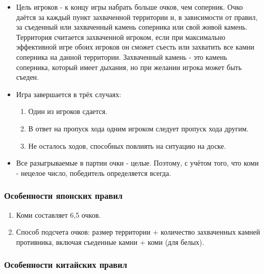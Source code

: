 \begin{itemize}
\item Цель игроков - к концу игры набрать больше очков, чем соперник. Очко даётся за каждый пункт захваченной территории и, в зависимости от правил, за съеденный или захваченный камень соперника или свой живой камень. Территория считается захваченной игроком, если при максимально эффективной игре обоих игроков он сможет съесть или захватить все камни соперника на данной территории. Захваченный камень - это камень соперника, который имеет дыхания, но при желании игрока может быть съеден.\\

\item Игра завершается в трёх случаях:


\begin{enumerate}

	\item Один из игроков сдается.\\
	\item В ответ на пропуск хода одним игроком следует пропуск хода другим.\\
	\item  Не осталось ходов, способных повлиять на ситуацию на доске.\\

\end{enumerate}

\item Все разыгрываемые в партии очки - целые. Поэтому, с учётом того, что коми - нецелое число, победитель определяется всегда.\\

\end{itemize}

\subsubsection*{Особенности японских правил}

\begin{enumerate}

\item Коми составляет 6,5 очков.\\
\item Способ подсчета очков: размер территории + количество захваченных камней противника, включая съеденные камни + коми (для белых).

\end{enumerate}

\subsubsection*{Особенности китайских правил}

